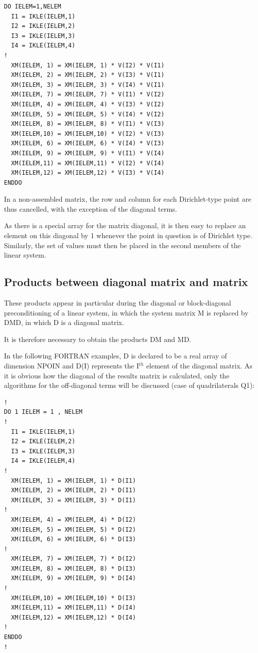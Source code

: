 \begin{lstlisting}[language=TelFortran]
DO IELEM=1,NELEM
  I1 = IKLE(IELEM,1)
  I2 = IKLE(IELEM,2)
  I3 = IKLE(IELEM,3)
  I4 = IKLE(IELEM,4)
!
  XM(IELEM, 1) = XM(IELEM, 1) * V(I2) * V(I1)
  XM(IELEM, 2) = XM(IELEM, 2) * V(I3) * V(I1)
  XM(IELEM, 3) = XM(IELEM, 3) * V(I4) * V(I1)
  XM(IELEM, 7) = XM(IELEM, 7) * V(I1) * V(I2)
  XM(IELEM, 4) = XM(IELEM, 4) * V(I3) * V(I2)
  XM(IELEM, 5) = XM(IELEM, 5) * V(I4) * V(I2)
  XM(IELEM, 8) = XM(IELEM, 8) * V(I1) * V(I3)
  XM(IELEM,10) = XM(IELEM,10) * V(I2) * V(I3)
  XM(IELEM, 6) = XM(IELEM, 6) * V(I4) * V(I3)
  XM(IELEM, 9) = XM(IELEM, 9) * V(I1) * V(I4)
  XM(IELEM,11) = XM(IELEM,11) * V(I2) * V(I4)
  XM(IELEM,12) = XM(IELEM,12) * V(I3) * V(I4)
ENDDO
\end{lstlisting}

In a non-assembled matrix, the row and column for each Dirichlet-type point are
thus cancelled, with the exception of the diagonal terms.

As there is a special array for the matrix diagonal, it is then easy to replace
an element on this diagonal by 1 whenever the point in question is of Dirichlet
type. Similarly, the set of values must then be placed in the second members of
the linear system.

\subsection{Products between diagonal matrix and matrix}

These products appear in particular during the diagonal or block-diagonal
preconditioning of a linear system, in which the system matrix M is replaced by
DMD, in which D is a diagonal matrix.

It is therefore necessary to obtain the products DM and MD.

In the following FORTRAN examples, D is declared to be a real array of
dimension NPOIN and D(I) represents the I${}^{th}$ element of the diagonal
matrix. As it is obvious how the diagonal of the results matrix is calculated,
only the algorithms for the off-diagonal terms will be discussed (case of
quadrilaterals Q1):


\begin{lstlisting}[language=TelFortran]
!
DO 1 IELEM = 1 , NELEM
!
  I1 = IKLE(IELEM,1)
  I2 = IKLE(IELEM,2)
  I3 = IKLE(IELEM,3)
  I4 = IKLE(IELEM,4)
!
  XM(IELEM, 1) = XM(IELEM, 1) * D(I1)
  XM(IELEM, 2) = XM(IELEM, 2) * D(I1)
  XM(IELEM, 3) = XM(IELEM, 3) * D(I1)
!
  XM(IELEM, 4) = XM(IELEM, 4) * D(I2)
  XM(IELEM, 5) = XM(IELEM, 5) * D(I2)
  XM(IELEM, 6) = XM(IELEM, 6) * D(I3)
!
  XM(IELEM, 7) = XM(IELEM, 7) * D(I2)
  XM(IELEM, 8) = XM(IELEM, 8) * D(I3)
  XM(IELEM, 9) = XM(IELEM, 9) * D(I4)
!
  XM(IELEM,10) = XM(IELEM,10) * D(I3)
  XM(IELEM,11) = XM(IELEM,11) * D(I4)
  XM(IELEM,12) = XM(IELEM,12) * D(I4)
!
ENDDO
!
\end{lstlisting}

